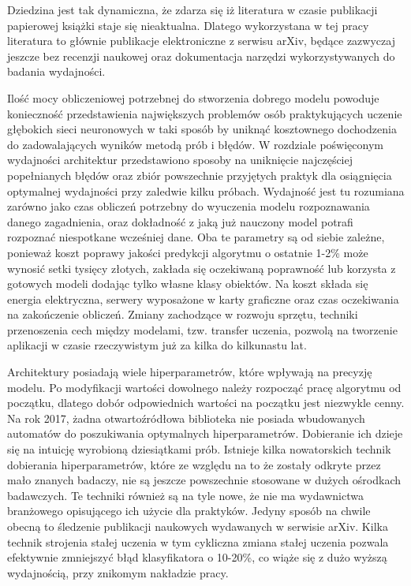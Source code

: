 \documentclass[12pt,a4paper,twoside,titlepage,openright]{book}
\begin{document}
Dziedzina jest tak dynamiczna, że zdarza się iż literatura w czasie publikacji papierowej książki staje się nieaktualna. Dlatego wykorzystana w tej pracy literatura to głównie publikacje elektroniczne z serwisu arXiv, będące zazwyczaj jeszcze bez recenzji naukowej oraz dokumentacja narzędzi wykorzystywanych do badania wydajności. 

Ilość mocy obliczeniowej potrzebnej do stworzenia dobrego modelu powoduje konieczność przedstawienia największych problemów osób praktykujących uczenie głębokich sieci neuronowych w taki sposób by uniknąć kosztownego dochodzenia do zadowalających wyników metodą prób i błędów. W rozdziale poświęconym wydajności architektur przedstawiono sposoby na uniknięcie najczęściej popełnianych błędów oraz zbiór powszechnie przyjętych praktyk dla osiągnięcia optymalnej wydajności przy zaledwie kilku próbach. Wydajność jest tu rozumiana zarówno jako czas obliczeń potrzebny do wyuczenia modelu rozpoznawania danego zagadnienia, oraz dokładność z jaką już nauczony model potrafi rozpoznać niespotkane wcześniej dane. Oba te parametry są od siebie zależne, ponieważ koszt poprawy jakości predykcji algorytmu o ostatnie 1-2\% może wynosić setki tysięcy złotych, zakłada się oczekiwaną poprawność lub korzysta z gotowych modeli dodając tylko własne klasy obiektów. Na koszt składa się energia elektryczna, serwery wyposażone w karty graficzne oraz czas oczekiwania na zakończenie obliczeń. Zmiany zachodzące w rozwoju sprzętu, techniki przenoszenia cech między modelami, tzw. transfer uczenia, pozwolą na tworzenie aplikacji w czasie rzeczywistym już za kilka do kilkunastu lat.

Architektury posiadają wiele hiperparametrów, które wpływają na precyzję modelu. Po modyfikacji wartości dowolnego należy rozpocząć pracę algorytmu od początku, dlatego dobór odpowiednich wartości na początku jest niezwykle cenny. Na rok 2017, żadna otwartoźródłowa biblioteka nie posiada wbudowanych automatów do poszukiwania optymalnych hiperparametrów. Dobieranie ich dzieje się na intuicję wyrobioną dziesiątkami prób. Istnieje kilka nowatorskich technik dobierania hiperparametrów, które ze względu na to że zostały odkryte przez mało znanych badaczy, nie są jeszcze powszechnie stosowane w dużych ośrodkach badawczych. Te techniki również są na tyle nowe, że nie ma wydawnictwa branżowego opisującego ich użycie dla praktyków. Jedyny sposób na chwile obecną to śledzenie publikacji naukowych wydawanych w serwisie arXiv. Kilka technik strojenia stałej uczenia w tym cykliczna zmiana stałej uczenia pozwala efektywnie zmniejszyć błąd klasyfikatora o 10-20\%, co wiąże się z dużo wyższą wydajnością, przy znikomym nakładzie pracy. 
\end{document}
